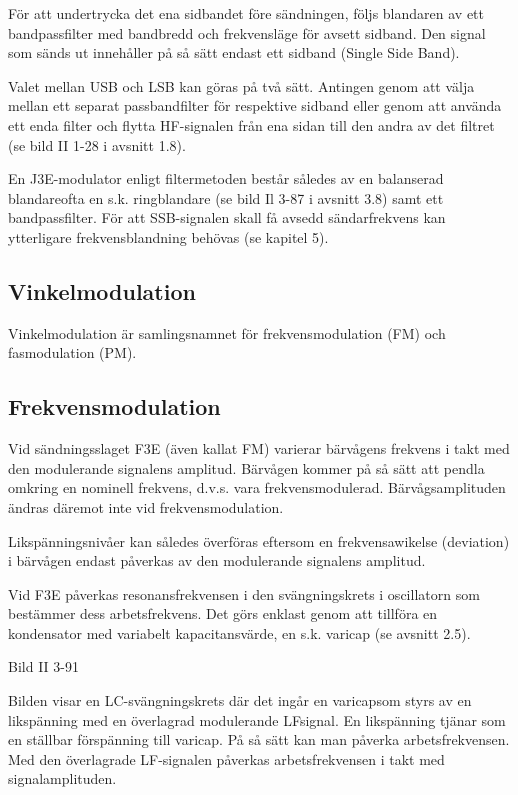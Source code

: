 För att undertrycka det ena sidbandet före sändningen, följs blandaren
av ett bandpassfilter med bandbredd och frekvensläge för avsett
sidband. Den signal som sänds ut innehåller på så sätt endast ett
sidband (Single Side Band).

Valet mellan USB och LSB kan göras på två sätt. Antingen genom att
välja mellan ett separat passbandfilter för respektive sidband eller
genom att använda ett enda filter och flytta HF-signalen från ena
sidan till den andra av det filtret (se bild II 1-28 i avsnitt 1.8).

En J3E-modulator enligt filtermetoden består således av en balanserad
blandareofta en s.k. ringblandare (se bild Il 3-87 i avsnitt 3.8) samt
ett bandpassfilter.  För att SSB-signalen skall få avsedd
sändarfrekvens kan ytterligare frekvensblandning behövas (se kapitel
5).

\subsection{Vinkelmodulation}

Vinkelmodulation är samlingsnamnet för frekvensmodulation (FM) och
fasmodulation (PM).

\subsection{Frekvensmodulation}
Vid sändningsslaget F3E (även kallat FM) varierar bärvågens frekvens i
takt med den modulerande signalens amplitud. Bärvågen kommer på så
sätt att pendla omkring en nominell frekvens, d.v.s. vara
frekvensmodulerad. Bärvågsamplituden ändras däremot inte vid
frekvensmodulation.

Likspänningsnivåer kan således överföras eftersom en frekvensawikelse
(deviation) i bärvågen endast påverkas av den modulerande signalens
amplitud.

Vid F3E påverkas resonansfrekvensen i den svängningskrets i
oscillatorn som bestämmer dess arbetsfrekvens. Det görs enklast genom
att tillföra en kondensator med variabelt kapacitansvärde, en
s.k. varicap (se avsnitt 2.5). %

Bild II 3-91

Bilden visar en LC-svängningskrets där det ingår en varicapsom styrs
av en likspänning med en överlagrad modulerande LFsignal. En
likspänning tjänar som en ställbar förspänning till varicap. På så
sätt kan man påverka arbetsfrekvensen. Med den överlagrade LF-signalen
påverkas arbetsfrekvensen i takt med signalamplituden.

